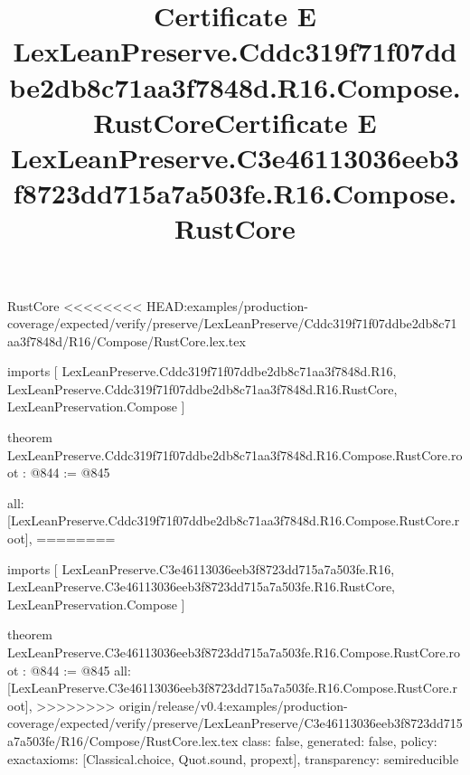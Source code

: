 \begin{lexlean}{RustCore}
<<<<<<<< HEAD:examples/production-coverage/expected/verify/preserve/LexLeanPreserve/Cddc319f71f07ddbe2db8c71aa3f7848d/R16/Compose/RustCore.lex.tex
\title{Certificate E LexLeanPreserve.Cddc319f71f07ddbe2db8c71aa3f7848d.R16.Compose.RustCore}
\begin{coremodule}
imports [
  LexLeanPreserve.Cddc319f71f07ddbe2db8c71aa3f7848d.R16,
  LexLeanPreserve.Cddc319f71f07ddbe2db8c71aa3f7848d.R16.RustCore,
  LexLeanPreservation.Compose
]

theorem LexLeanPreserve.Cddc319f71f07ddbe2db8c71aa3f7848d.R16.Compose.RustCore.root : @844 := @845 {
  all: [LexLeanPreserve.Cddc319f71f07ddbe2db8c71aa3f7848d.R16.Compose.RustCore.root],
========
\title{Certificate E LexLeanPreserve.C3e46113036eeb3f8723dd715a7a503fe.R16.Compose.RustCore}
\begin{coremodule}
imports [
  LexLeanPreserve.C3e46113036eeb3f8723dd715a7a503fe.R16,
  LexLeanPreserve.C3e46113036eeb3f8723dd715a7a503fe.R16.RustCore,
  LexLeanPreservation.Compose
]

theorem LexLeanPreserve.C3e46113036eeb3f8723dd715a7a503fe.R16.Compose.RustCore.root : @844 := @845 {
  all: [LexLeanPreserve.C3e46113036eeb3f8723dd715a7a503fe.R16.Compose.RustCore.root],
>>>>>>>> origin/release/v0.4:examples/production-coverage/expected/verify/preserve/LexLeanPreserve/C3e46113036eeb3f8723dd715a7a503fe/R16/Compose/RustCore.lex.tex
  class: false,
  generated: false,
  policy: exact{axioms: [Classical.choice, Quot.sound, propext]},
  transparency: semireducible
}


\end{coremodule}}
\end{coremodule}
\end{lexlean}
